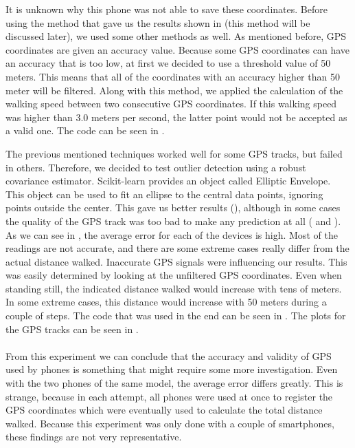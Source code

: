 It is unknown why this phone was not able to save these coordinates.
Before using the method that gave us the results shown in  (this method will be discussed later), we used some other methods as well.
As mentioned before, GPS coordinates are given an accuracy value.
Because some GPS coordinates can have an accuracy that is too low, at first we decided to use a threshold value of 50 meters. 
This means that all of the coordinates with an accuracy higher than 50 meter will be filtered. 
Along with this method, we applied the calculation of the walking speed between two consecutive GPS coordinates. 
If this walking speed was higher than 3.0 meters per second, the latter point would not be accepted as a valid one.
The code can be seen in .

The previous mentioned techniques worked well for some GPS tracks, but failed in others.
Therefore, we decided to test outlier detection using a robust covariance estimator.
Scikit-learn \cite{pedregosa2011scikit} provides an object called Elliptic Envelope.
This object can be used to fit an ellipse to the central data points, ignoring points outside the center.
This gave us better results (), although in some cases the quality of the GPS track was too bad to make any prediction at all ( and ). As we can see in , the average error for each of the devices is high.
Most of the readings are not accurate, and there are some extreme cases really differ from the actual distance walked.
Inaccurate GPS signals were influencing our results.
This was easily determined by looking at the unfiltered GPS coordinates.
Even when standing still, the indicated distance walked would increase with tens of meters.
In some extreme cases, this distance would increase with 50 meters during a couple of steps.
The code that was used in the end can be seen in . The plots for the GPS tracks can be seen in . \\\\
From this experiment we can conclude that the accuracy and validity of GPS used by phones is something that might require some more investigation.
Even with the two phones of the same model, the average error differs greatly.
This is strange, because in each attempt, all phones were used at once to register the GPS coordinates which were eventually used to calculate the total distance walked.
Because this experiment was only done with a couple of smartphones, these findings are not very representative.

